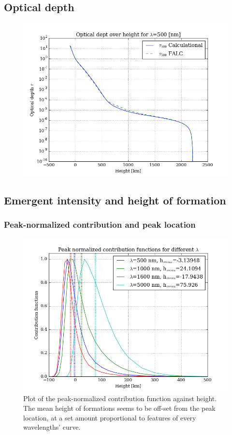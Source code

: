 \documentclass[11pt,a4paper,notitlepage]{article}
\begin{document}
\subsection{Optical depth}
\begin{figure}[H]
\center
	\includegraphics[scale=0.42]{../figs/2opt_depth.png}
	\caption{}
\end{figure}

\subsection{Emergent intensity and height of formation}

\subsubsection{Peak-normalized contribution and peak location}
\begin{figure}[H]
\center
	\includegraphics[scale=0.42]{../figs/2emer_peaknormcont_vs_h_wls.png}
	\caption{Plot of the peak-normalized contribution function against height.
	The mean height of formations seems to be off-set from the peak location, at a set amount proportional to features of every wavelengths' curve.}
\end{figure}
\end{document}
